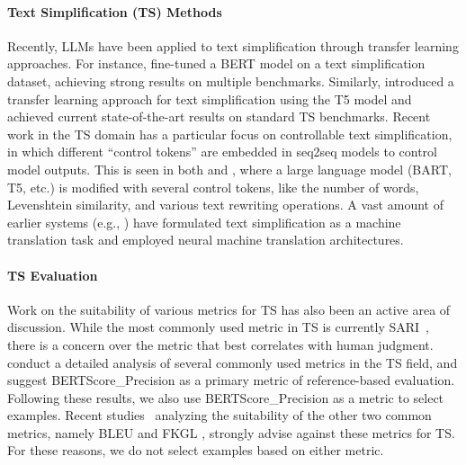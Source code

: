 \documentclass[11pt]{article}
\begin{document}
\paragraph{Text Simplification (TS) Methods} 
Recently, LLMs have been applied to text simplification through transfer learning approaches. For instance, \citet{qiang2020BERTLS} fine-tuned a BERT model on a text simplification dataset, achieving strong results on multiple benchmarks. Similarly, \citet{sheang-saggion-2021-controllable} introduced a transfer learning approach for text simplification using the T5 model and achieved current state-of-the-art results on standard TS benchmarks. Recent work in the TS domain has a particular focus on controllable text simplification, in which different ``control tokens'' are embedded in seq2seq models to control model outputs. This is seen in both \citet{sheang-saggion-2021-controllable} and \citet{chamovitz2022cognitive}, where a large language model (BART, T5, etc.) is modified with several control tokens, like the number of words, Levenshtein similarity, and various text rewriting operations. A vast amount of earlier systems (e.g., \citep{xu-etal-2016-optimizing}) have formulated text simplification as a machine translation task and employed neural machine translation architectures. 

\paragraph{TS Evaluation} Work on the suitability of various metrics for TS has also been an active area of discussion. While the most commonly used metric in TS is currently SARI~\citep{xu-etal-2016-optimizing}, there is a concern over the metric that best correlates with human judgment. \citet{alva-manchego-etal-2021-un} conduct a detailed analysis of several commonly used metrics in the TS field, and suggest BERTScore\_Precision as a primary metric of reference-based evaluation. Following these results, we also use BERTScore\_Precision as a metric to select examples. Recent studies~\citep{sulem-etal-2018-bleu, tanprasert-kauchak-2021-flesch} analyzing the suitability of the other two common metrics, namely BLEU \citep{papineni-etal-2002-bleu} and FKGL \citep{kincaid1975derivation}, strongly advise against these metrics for TS. For these reasons, we do not select examples based on either metric.
\end{document}
